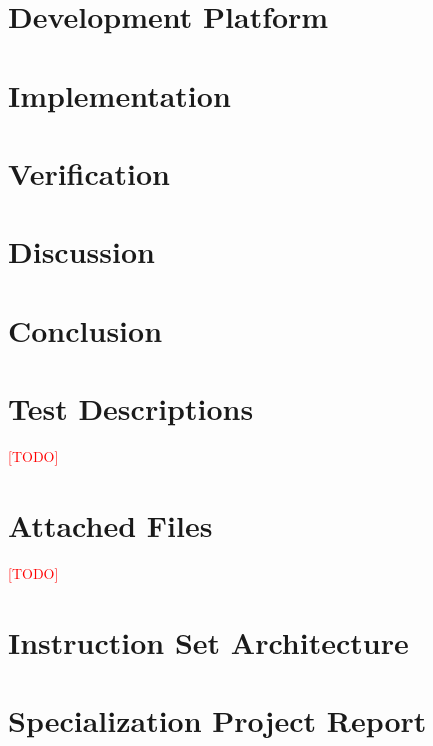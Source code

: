 \documentclass[a4paper,twoside,12pt]{book}
\newcommand\TODO{\textcolor{red}{[TODO]}}
\begin{document}
\chapter{Development Platform}
    \label{ch:development-platform}
    

\chapter{Implementation}
    \label{ch:implementation}
    

\chapter{Verification}
    \label{ch:verification}
    

\chapter{Discussion}
    \label{ch:discussion}
    

\chapter{Conclusion}
    \label{ch:conclusion}
    

\cleardoublepage
{}
{}



\appendix

\chapter{Test Descriptions}

\TODO

\chapter{Attached Files}

\TODO

\chapter{Instruction Set Architecture}

%

\chapter{Specialization Project Report}

%
\end{document}
